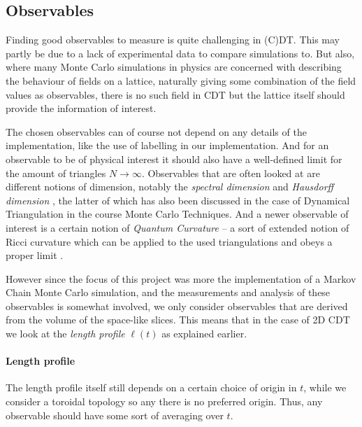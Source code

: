 \subsection{Observables} \label{sec:observables}
Finding good observables to measure is quite challenging in (C)DT. This may partly be due to a lack of experimental data to compare simulations to.
But also, where many Monte Carlo simulations in physics are concerned with describing the behaviour of fields on a lattice, naturally giving some combination of the field values as observables,
there is no such field in CDT but the lattice itself should provide the information of interest.

The chosen observables can of course not depend on any details of the implementation, like the use of labelling in our implementation.
And for an observable to be of physical interest it should also have a well-defined limit for the amount of triangles $N \rightarrow \infty$.
Observables that are often looked at are different notions of dimension, notably the \emph{spectral dimension} \cite{2012} and \emph{Hausdorff dimension} \cite{1998, 2012}, the latter of which has also been discussed in the case of Dynamical Triangulation in the course Monte Carlo Techniques. And a newer observable of interest is a certain notion of \emph{Quantum Curvature} -- a sort of extended notion of Ricci curvature which can be applied to the used triangulations and obeys a proper limit \cite{brunekreef2021}.

However since the focus of this project was more the implementation of a Markov Chain Monte Carlo simulation, and the measurements and analysis of these observables is somewhat involved, we only consider observables that are derived from the volume of the space-like slices.
This means that in the case of 2D CDT we look at the \emph{length profile} $\ell(t)$ as explained earlier.

\paragraph{Length profile}
The length profile itself still depends on a certain choice of origin in $t$, while we consider a toroidal topology so any there is no preferred origin. Thus, any observable should have some sort of averaging over $t$.

